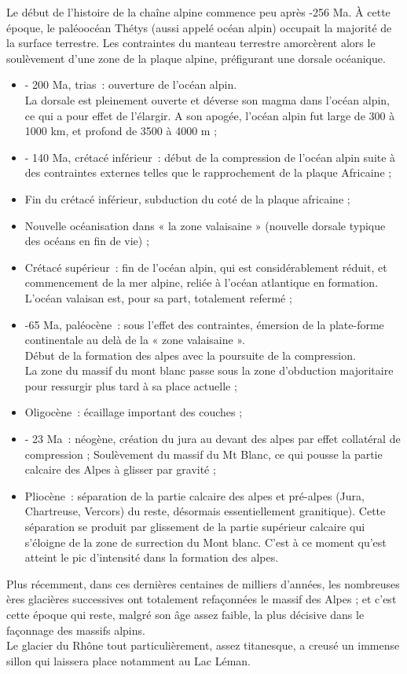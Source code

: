 \documentclass[a4paper,11pt]{article}
\begin{document}
Le début de l'histoire de la chaîne alpine commence peu après -256 Ma. À cette époque, le paléoocéan Thétys (aussi appelé océan alpin) occupait la majorité de la surface terrestre.
Les contraintes du manteau terrestre amorcèrent alors le soulèvement d'une zone de la plaque alpine, préfigurant une dorsale océanique.
\begin{itemize}
  \item - 200 Ma, trias~: ouverture de l'océan alpin.\\
  La dorsale est pleinement ouverte et déverse son  magma dans l'océan alpin, ce qui a pour effet de l'élargir.
  A son apogée, l'océan alpin fut large de 300 à 1000 km, et profond de 3500 à 4000 m ;
  \item - 140 Ma, crétacé inférieur~: début de la compression de l'océan alpin suite à des contraintes externes telles que le rapprochement de la plaque Africaine ;
  \item Fin du crétacé inférieur, subduction du coté de la plaque africaine ;
  \item Nouvelle océanisation dans « la zone valaisaine » (nouvelle dorsale typique des océans en fin de vie) ;
  \item Crétacé supérieur~: fin de l'océan alpin, qui est considérablement réduit, et commencement de la mer alpine, reliée à l'océan atlantique en formation. L'océan valaisan est, pour sa part, totalement refermé ;
  \item -65 Ma, paléocène~: sous l'effet des contraintes, émersion de la plate-forme continentale au delà de la « zone valaisaine ».\\
  Début de la formation des alpes avec la poursuite de la compression.\\
  La zone du massif du mont blanc passe sous la zone d'obduction majoritaire pour ressurgir plus tard à sa place actuelle ;
  \item Oligocène~: écaillage important des couches ;
  \item - 23 Ma~: néogène, création du jura au devant des alpes par effet collatéral de compression ;
  Soulèvement du massif du Mt Blanc, ce qui pousse la partie calcaire des Alpes à glisser par gravité ;
  \item Pliocène~: séparation de la partie calcaire des alpes et pré-alpes (Jura, Chartreuse, Vercors) du reste, désormais essentiellement granitique). Cette séparation se produit par glissement de la partie supérieur calcaire qui s'éloigne de la zone de surrection du Mont blanc.
  C'est à ce moment qu'est atteint le pic d'intensité dans la formation des alpes.
\end{itemize}
Plus récemment, dans ces dernières centaines de milliers d'années, les nombreuses ères glacières successives ont totalement refaçonnées le massif des Alpes ; et c'est cette époque qui reste, malgré son âge assez faible, la plus décisive dans le façonnage des massifs alpins.\\
  Le glacier du Rhône tout particulièrement, assez titanesque, a creusé un immense sillon qui laissera place notamment au Lac Léman. 
\end{document}
